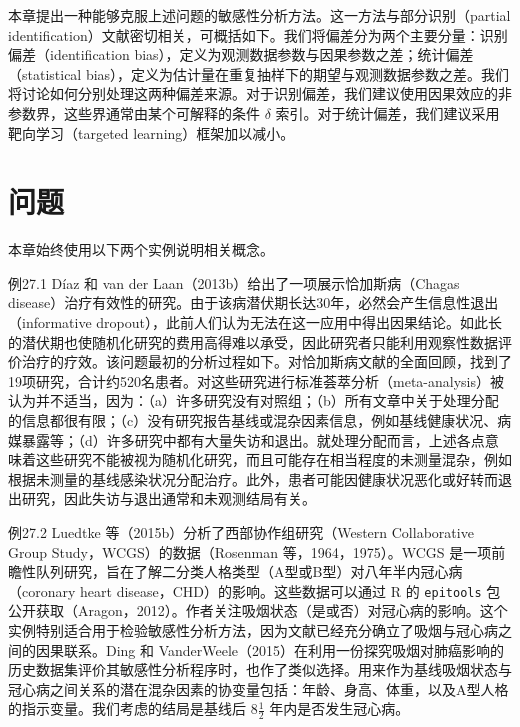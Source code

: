 \begin{sourcebox}
本章提出一种能够克服上述问题的敏感性分析方法。这一方法与部分识别（partial identification）文献密切相关，可概括如下。我们将偏差分为两个主要分量：识别偏差（identification bias），定义为观测数据参数与因果参数之差；统计偏差（statistical bias），定义为估计量在重复抽样下的期望与观测数据参数之差。我们将讨论如何分别处理这两种偏差来源。对于识别偏差，我们建议使用因果效应的非参数界，这些界通常由某个可解释的条件 $\delta$ 索引。对于统计偏差，我们建议采用靶向学习（targeted learning）框架加以减小。
\end{sourcebox}

\section{问题}

本章始终使用以下两个实例说明相关概念。

\begin{bookresult}{例}{27.1}
Díaz 和 van der Laan（2013b）给出了一项展示恰加斯病（Chagas disease）治疗有效性的研究。由于该病潜伏期长达30年，必然会产生信息性退出（informative dropout），此前人们认为无法在这一应用中得出因果结论。如此长的潜伏期也使随机化研究的费用高得难以承受，因此研究者只能利用观察性数据评价治疗的疗效。该问题最初的分析过程如下。对恰加斯病文献的全面回顾，找到了19项研究，合计约520名患者。对这些研究进行标准荟萃分析（meta-analysis）被认为并不适当，因为：（a）许多研究没有对照组；（b）所有文章中关于处理分配的信息都很有限；（c）没有研究报告基线或混杂因素信息，例如基线健康状况、病媒暴露等；（d）许多研究中都有大量失访和退出。就处理分配而言，上述各点意味着这些研究不能被视为随机化研究，而且可能存在相当程度的未测量混杂，例如根据未测量的基线感染状况分配治疗。此外，患者可能因健康状况恶化或好转而退出研究，因此失访与退出通常和未观测结局有关。
\end{bookresult}

\begin{bookresult}{例}{27.2}
Luedtke 等（2015b）分析了西部协作组研究（Western Collaborative Group Study，WCGS）的数据（Rosenman 等，1964，1975）。WCGS 是一项前瞻性队列研究，旨在了解二分类人格类型（A型或B型）对八年半内冠心病（coronary heart disease，CHD）的影响。这些数据可以通过 R 的 \texttt{epitools} 包公开获取（Aragon，2012）。作者关注吸烟状态（是或否）对冠心病的影响。这个实例特别适合用于检验敏感性分析方法，因为文献已经充分确立了吸烟与冠心病之间的因果联系。Ding 和 VanderWeele（2015）在利用一份探究吸烟对肺癌影响的历史数据集评价其敏感性分析程序时，也作了类似选择。用来作为基线吸烟状态与冠心病之间关系的潜在混杂因素的协变量包括：年龄、身高、体重，以及A型人格的指示变量。我们考虑的结局是基线后 $8\frac12$ 年内是否发生冠心病。
\end{bookresult}

